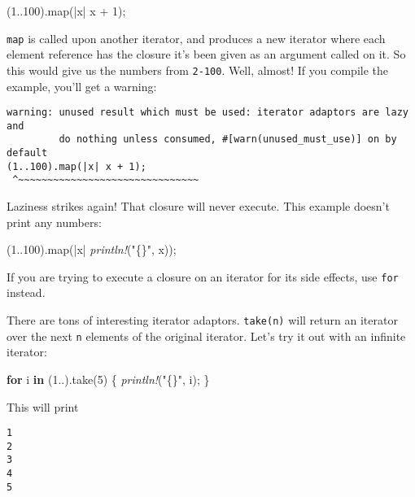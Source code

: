 \documentclass[a4paper,]{book}
\newenvironment{Shaded}{\begin{snugshade}}{\end{snugshade}}
\newcommand{\KeywordTok}[1]{\textcolor[rgb]{0.13,0.29,0.53}{\textbf{{#1}}}}
\newcommand{\DecValTok}[1]{\textcolor[rgb]{0.00,0.00,0.81}{{#1}}}
\newcommand{\StringTok}[1]{\textcolor[rgb]{0.31,0.60,0.02}{{#1}}}
\newcommand{\PreprocessorTok}[1]{\textcolor[rgb]{0.56,0.35,0.01}{\textit{{#1}}}}
\newcommand{\NormalTok}[1]{{#1}}
\begin{document}
\begin{Shaded}
\begin{Highlighting}[]
\NormalTok{(}\DecValTok{1.}\NormalTok{.}\DecValTok{100}\NormalTok{).map(|x| x + }\DecValTok{1}\NormalTok{);}
\end{Highlighting}
\end{Shaded}

\texttt{map} is called upon another iterator, and produces a new
iterator where each element reference has the closure it's been given as
an argument called on it. So this would give us the numbers from
\texttt{2-100}. Well, almost! If you compile the example, you'll get a
warning:

\begin{verbatim}
warning: unused result which must be used: iterator adaptors are lazy and
         do nothing unless consumed, #[warn(unused_must_use)] on by default
(1..100).map(|x| x + 1);
 ^~~~~~~~~~~~~~~~~~~~~~~~~~~~~~~~
\end{verbatim}

Laziness strikes again! That closure will never execute. This example
doesn't print any numbers:

\begin{Shaded}
\begin{Highlighting}[]
\NormalTok{(}\DecValTok{1.}\NormalTok{.}\DecValTok{100}\NormalTok{).map(|x| }\PreprocessorTok{println!}\NormalTok{(}\StringTok{"\{\}"}\NormalTok{, x));}
\end{Highlighting}
\end{Shaded}

If you are trying to execute a closure on an iterator for its side
effects, use \texttt{for} instead.

There are tons of interesting iterator adaptors. \texttt{take(n)} will
return an iterator over the next \texttt{n} elements of the original
iterator. Let's try it out with an infinite iterator:

\begin{Shaded}
\begin{Highlighting}[]
\KeywordTok{for} \NormalTok{i }\KeywordTok{in} \NormalTok{(}\DecValTok{1.}\NormalTok{.).take(}\DecValTok{5}\NormalTok{) \{}
    \PreprocessorTok{println!}\NormalTok{(}\StringTok{"\{\}"}\NormalTok{, i);}
\NormalTok{\}}
\end{Highlighting}
\end{Shaded}

This will print

\begin{verbatim}
1
2
3
4
5
\end{verbatim}
\end{document}
